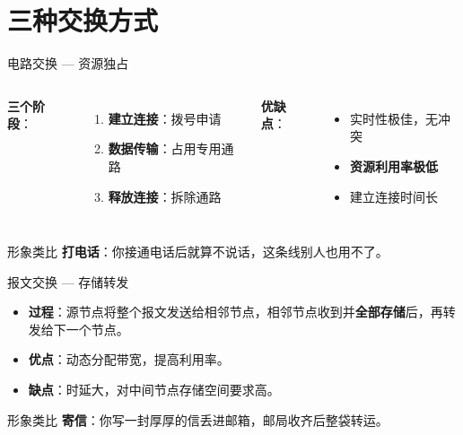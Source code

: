\documentclass[10pt, aspectratio=169]{beamer}
\begin{document}
\section{三种交换方式}

\begin{frame}{电路交换 --- 资源独占}
    \begin{columns}[T]
        \textbf{三个阶段}：
        \begin{enumerate}
            \item \textbf{建立连接}：拨号申请
            \item \textbf{数据传输}：占用专用通路
            \item \textbf{释放连接}：拆除通路
        \end{enumerate}
        \textbf{优缺点}：
        \begin{itemize}
            \item[\color{green!70!black}$\checkmark$] 实时性极佳，无冲突
            \item[\color{red!70!black}$\times$] \textbf{资源利用率极低}
            \item[\color{red!70!black}$\times$] 建立连接时间长
        \end{itemize}
    \end{columns}
    \vspace{1em}
    \begin{exampleblock}{形象类比}
        \textbf{打电话}：你接通电话后就算不说话，这条线别人也用不了。
    \end{exampleblock}
\end{frame}

\begin{frame}{报文交换 --- 存储转发}
    \begin{itemize}
        \item \textbf{过程}：源节点将整个报文发送给相邻节点，相邻节点收到并\textbf{全部存储}后，再转发给下一个节点。
        \item \textbf{优点}：动态分配带宽，提高利用率。
        \item \textbf{缺点}：时延大，对中间节点存储空间要求高。
    \end{itemize}
    \vspace{1em}
    \begin{exampleblock}{形象类比}
        \textbf{寄信}：你写一封厚厚的信丢进邮箱，邮局收齐后整袋转运。
    \end{exampleblock}
\end{frame}
\end{document}

